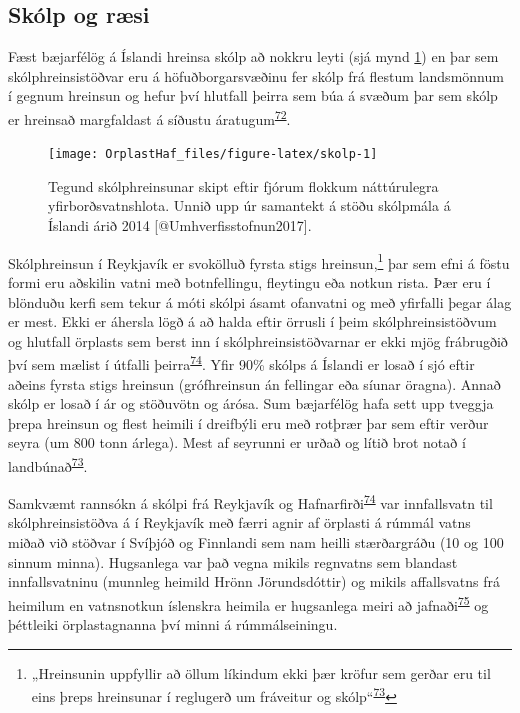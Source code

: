 \documentclass[icelandic,]{book}
\let\rmarkdownfootnote\footnote%
\def\footnote{\protect\rmarkdownfootnote}
\begin{document}
\hypertarget{skolp-og-rsi}{%
\subsection*{Skólp og ræsi}\label{skolp-og-rsi}}

Fæst bæjarfélög á Íslandi hreinsa skólp að nokkru leyti (sjá mynd \ref{fig:skolp}) en þar sem skólphreinsistöðvar eru á höfuðborgarsvæðinu fer skólp frá flestum landsmönnum í gegnum hreinsun og hefur því hlutfall þeirra sem búa á svæðum þar sem skólp er hreinsað margfaldast á síðustu áratugum\textsuperscript{\protect\hyperlink{ref-uxdeoruxf0arson2012}{72}}.

\begin{figure}

{\centering \texttt{[image: OrplastHaf\_files/figure-latex/skolp-1]} 

}

\caption{Tegund skólphreinsunar skipt eftir fjórum flokkum náttúrulegra yfirborðsvatnshlota. Unnið upp úr samantekt á stöðu skólpmála á Íslandi árið 2014 [@Umhverfisstofnun2017].}\label{fig:skolp}
\end{figure}

Skólphreinsun í Reykjavík er svokölluð fyrsta stigs hreinsun,\footnote{„Hreinsunin uppfyllir að öllum líkindum ekki þær kröfur sem gerðar eru til eins þreps hreinsunar í reglugerð um fráveitur og skólp``\textsuperscript{\protect\hyperlink{ref-Umhverfisstofnun2017}{73}}} þar sem efni á föstu formi eru aðskilin vatni með botnfellingu, fleytingu eða notkun rista. Þær eru í blönduðu kerfi sem tekur á móti skólpi ásamt ofanvatni og með yfirfalli þegar álag er mest. Ekki er áhersla lögð á að halda eftir örrusli í þeim skólphreinsistöðvum og hlutfall örplasts sem berst inn í skólphreinsistöðvarnar er ekki mjög frábrugðið því sem mælist í útfalli þeirra\textsuperscript{\protect\hyperlink{ref-magnusson2016microlitter}{74}}. Yfir 90\% skólps á Íslandi er losað í sjó eftir aðeins fyrsta stigs hreinsun (grófhreinsun án fellingar eða síunar öragna). Annað skólp er losað í ár og stöðuvötn og árósa. Sum bæjarfélög hafa sett upp tveggja þrepa hreinsun og flest heimili í dreifbýli eru með rotþrær þar sem eftir verður seyra (um 800 tonn árlega). Mest af seyrunni er urðað og lítið brot notað í landbúnað\textsuperscript{\protect\hyperlink{ref-Umhverfisstofnun2017}{73}}.

Samkvæmt rannsókn á skólpi frá Reykjavík og Hafnarfirði\textsuperscript{\protect\hyperlink{ref-magnusson2016microlitter}{74}} var innfallsvatn til skólphreinsistöðva á í Reykjavík með færri agnir af örplasti á rúmmál vatns miðað við stöðvar í Svíþjóð og Finnlandi sem nam heilli stærðargráðu (10 og 100 sinnum minna). Hugsanlega var það vegna mikils regnvatns sem blandast innfallsvatninu (munnleg heimild Hrönn Jörundsdóttir) og mikils affallsvatns frá heimilum en vatnsnotkun íslenskra heimila er hugsanlega meiri að jafnaði\textsuperscript{\protect\hyperlink{ref-Pakula2010}{75}} og þéttleiki örplastagnanna því minni á rúmmálseiningu.
\end{document}
